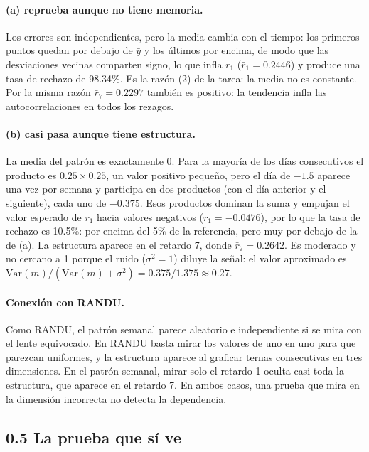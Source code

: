 \documentclass[11pt]{article}
\begin{document}
\paragraph{(a) reprueba aunque no tiene memoria.} Los errores son
independientes, pero la media cambia con el tiempo: los primeros puntos quedan
por debajo de $\bar y$ y los \'ultimos por encima, de modo que las desviaciones
vecinas comparten signo, lo que infla $r_1$ ($\bar r_1=0.2446$) y produce una
tasa de rechazo de 98.34\%. Es la raz\'on (2) de la tarea: la media no es
constante. Por la misma raz\'on $\bar r_7=0.2297$ tambi\'en es positivo: la
tendencia infla las autocorrelaciones en todos los rezagos.

\paragraph{(b) casi pasa aunque tiene estructura.} La media del patr\'on es
exactamente 0. Para la mayor\'ia de los d\'ias consecutivos el producto es
$0.25\times0.25$, un valor positivo peque\~no, pero el d\'ia de $-1.5$ aparece
una vez por semana y participa en dos productos (con el d\'ia anterior y el
siguiente), cada uno de $-0.375$. Esos productos dominan la suma y empujan el
valor esperado de $r_1$ hacia valores negativos ($\bar r_1=-0.0476$), por lo
que la tasa de rechazo es 10.5\%: por encima del 5\% de la referencia, pero
muy por debajo de la de (a). La estructura aparece en el retardo 7, donde
$\bar r_7=0.2642$. Es moderado y no cercano a 1 porque el ruido ($\sigma^2=1$)
diluye la se\~nal: el valor aproximado es
$\mathrm{Var}(m)/(\mathrm{Var}(m)+\sigma^2)=0.375/1.375\approx0.27$.

\paragraph{Conexi\'on con RANDU.} Como RANDU, el patr\'on semanal parece
aleatorio e independiente si se mira con el lente equivocado. En RANDU basta
mirar los valores de uno en uno para que parezcan uniformes, y la estructura
aparece al graficar ternas consecutivas en tres dimensiones. En el patr\'on
semanal, mirar solo el retardo 1 oculta casi toda la estructura, que aparece
en el retardo 7. En ambos casos, una prueba que mira en la dimensi\'on
incorrecta no detecta la dependencia.

\subsection*{0.5 La prueba que s\'i ve}
\end{document}
